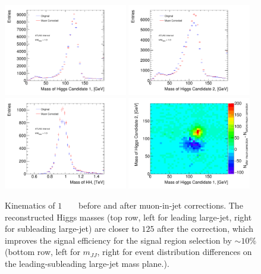 \begin{figure}
\begin{center}
  \includegraphics[width=0.48\textwidth]{figures/boosted/muons/h1_mass_dbl.pdf}
  \includegraphics[width=0.48\textwidth]{figures/boosted/muons/h2_mass_dbl.pdf}
  \includegraphics[width=0.48\textwidth]{figures/boosted/muons/hh_mass_dbl.pdf}
  \includegraphics[width=0.48\textwidth]{figures/boosted/muons/h12_corr_mass.pdf}
  \caption{Kinematics of $1$ \TeV~ \Grav~ before and after muon-in-jet corrections. The reconstructed Higgs masses (top row, left for leading large-\R jet, right for subleading large-\R jet) are closer to $125$ \GeV after the correction, which improves the signal efficiency for the signal region selection by $\sim\!10\%$ (bottom row, left for $m_{JJ}$, right for event distribution differences on the leading-subleading large-\R jet mass plane.).}
  \label{fig:boosted-muons-signal}
\end{center}
\end{figure}

